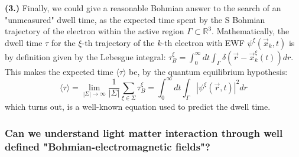 \documentclass[11pt, a4paper]{article} %
\newcommand{\R}{\mathbb{R}} %
\begin{document}
{\bf (3.) }Finally, we could give a reasonable Bohmian answer to the search of an "unmeasured" dwell time, as the expected time spent by the S Bohmian trajectory of the electron within the active region $\Gamma\subset \R^3$. Mathematically, the dwell time $\tau$ for the $\xi$-th trajectory of the $k$-th electron with EWF $\psi^\xi(\vec{x}_k,t)$ is by definition given by the Lebesgue integral: $\tau^\xi_B= \int_{0}^\infty  dt \int_\Gamma \delta(\vec{r}-\vec{x}_k^\xi(t)) dr$. This makes the expected time $\langle \tau\rangle$ be, by the quantum equilibrium hypothesis:
\begin{equation}
\langle \tau \rangle = \lim_{|\Sigma|\rightarrow \infty}\frac{1}{|\Sigma|} \sum_{\xi\in\Sigma} \tau_B^\xi = \int_{0}^\infty dt \int_\Gamma |\psi^\xi(\vec{r},t)|^2dr
\end{equation}
which turns out, is a well-known equation used to predict the dwell time.

\subsubsection*{Can we understand light matter interaction through well defined "Bohmian-electromagnetic fields"?}
\end{document}
